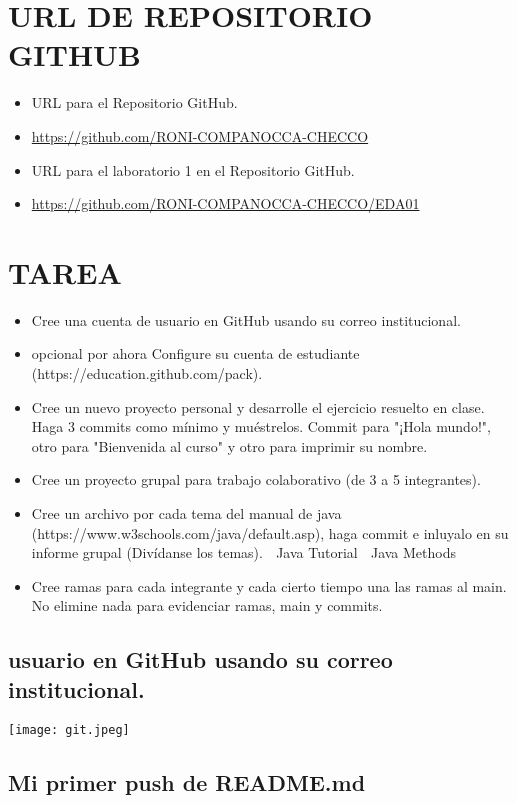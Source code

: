 \documentclass{article}
\begin{document}
 \section{URL DE REPOSITORIO GITHUB}
	\begin{itemize}
		\item URL para el Repositorio GitHub.
		\item \url{https://github.com/RONI-COMPANOCCA-CHECCO}
		\item URL para el laboratorio 1 en el Repositorio GitHub.	
        \item \url{https://github.com/RONI-COMPANOCCA-CHECCO/EDA01}
	\end{itemize}
 
    \section{TAREA}
	\begin{itemize}
		\item Cree una cuenta de usuario en GitHub usando su correo institucional.
		\item opcional por ahora Configure su cuenta de estudiante (https://education.github.com/pack).
		\item Cree un nuevo proyecto personal y desarrolle el ejercicio resuelto en clase. Haga 3 commits como mínimo y muéstrelos. Commit para "¡Hola mundo!", otro para "Bienvenida al curso" y otro para imprimir su nombre.
        \item Cree un proyecto grupal para trabajo colaborativo (de 3 a 5 integrantes).
        \item Cree un archivo por cada tema del manual de java (https://www.w3schools.com/java/default.asp), haga commit e inluyalo en su informe grupal (Divídanse los temas).
 Java Tutorial
 Java Methods
\item Cree ramas para cada integrante y cada cierto tiempo una las ramas al main. No elimine nada para
evidenciar ramas, main y commits.
	\end{itemize}

        \subsection{usuario en GitHub usando su correo institucional.}
 
             \texttt{[image: git.jpeg]}
        \subsection{Mi primer push de README.md}
 
\end{document}
